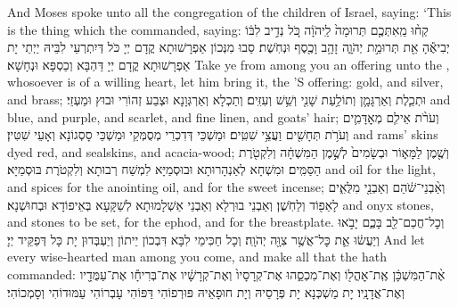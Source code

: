{And Moses spoke unto all the congregation of the children of Israel, saying: ‘This is the thing which the \lord\space commanded, saying:}{}
{קְח֨וּ מֵֽאִתְּכֶ֤ם תְּרוּמָה֙ לַֽיהֹוָ֔ה כֹּ֚ל נְדִ֣יב לִבּ֔וֹ יְבִיאֶ֕הָ אֵ֖ת תְּרוּמַ֣ת יְהֹוָ֑ה זָהָ֥ב וָכֶ֖סֶף וּנְחֹֽשֶׁת׃
}
{סַבוּ מִנְּכוֹן אַפְרָשׁוּתָא קֳדָם יְיָ כֹּל דְּיִתְרְעֵי לִבֵּיהּ יַיְתֵי יָת אַפְרָשׁוּתָא קֳדָם יְיָ דַּהְבָּא וְכַסְפָּא וּנְחָשָׁא׃}
{Take ye from among you an offering unto the \lord, whosoever is of a willing heart, let him bring it, the \lord’S offering: gold, and silver, and brass;}{}
{וּתְכֵ֧לֶת וְאַרְגָּמָ֛ן וְתוֹלַ֥עַת שָׁנִ֖י וְשֵׁ֥שׁ וְעִזִּֽים׃}
{וְתַכְלָא וְאַרְגְּוָנָא וּצְבַע זְהוֹרִי וּבוּץ וּמַעְזֵי׃}
{and blue, and purple, and scarlet, and fine linen, and goats’ hair;}{}
{וְעֹרֹ֨ת אֵילִ֧ם מְאׇדָּמִ֛ים וְעֹרֹ֥ת תְּחָשִׁ֖ים וַעֲצֵ֥י שִׁטִּֽים׃}
{וּמַשְׁכֵּי דְּדִכְרֵי מְסֻמְּקֵי וּמַשְׁכֵּי סָסְגוֹנָא וְאָעֵי שִׁטִּין׃}
{and rams’ skins dyed red, and sealskins, and acacia-wood;}{}
{וְשֶׁ֖מֶן לַמָּא֑וֹר וּבְשָׂמִים֙ לְשֶׁ֣מֶן הַמִּשְׁחָ֔ה וְלִקְטֹ֖רֶת הַסַּמִּֽים׃}
{וּמִשְׁחָא לְאַנְהָרוּתָא וּבוּסְמַיָּא לִמְשַׁח רְבוּתָא וְלִקְטֹרֶת בּוּסְמַיָּא׃}
{and oil for the light, and spices for the anointing oil, and for the sweet incense;}{}
{וְאַ֨בְנֵי־שֹׁ֔הַם וְאַבְנֵ֖י מִלֻּאִ֑ים לָאֵפ֖וֹד וְלַחֹֽשֶׁן׃}
{וְאַבְנֵי בוּרְלָא וְאַבְנֵי אַשְׁלָמוּתָא לְשַׁקָּעָא בְּאֵיפוֹדָא וּבְחוּשְׁנָא׃}
{and onyx stones, and stones to be set, for the ephod, and for the breastplate.}{}
{וְכׇל־חֲכַם־לֵ֖ב בָּכֶ֑ם יָבֹ֣אוּ וְיַעֲשׂ֔וּ אֵ֛ת כׇּל־אֲשֶׁ֥ר צִוָּ֖ה יְהֹוָֽה׃}
{וְכָל חַכִּימֵי לִבָּא דִּבְכוֹן יֵיתוֹן וְיַעְבְּדוּן יָת כָּל דְּפַקֵּיד יְיָ׃}
{And let every wise-hearted man among you come, and make all that the \lord\space hath commanded:}{}
{אֶ֨ת־הַמִּשְׁכָּ֔ן אֶֽת־אׇהֳל֖וֹ וְאֶת־מִכְסֵ֑הוּ אֶת־קְרָסָיו֙ וְאֶת־קְרָשָׁ֔יו אֶת־בְּרִיחָ֕ו אֶת־עַמֻּדָ֖יו וְאֶת־אֲדָנָֽיו׃
}
{יָת מַשְׁכְּנָא יָת פְּרָסֵיהּ וְיָת חוּפָאֵיהּ פּוּרְפוֹהִי דַּפּוֹהִי עָבְרוֹהִי עַמּוּדוֹהִי וְסָמְכוֹהִי׃}
